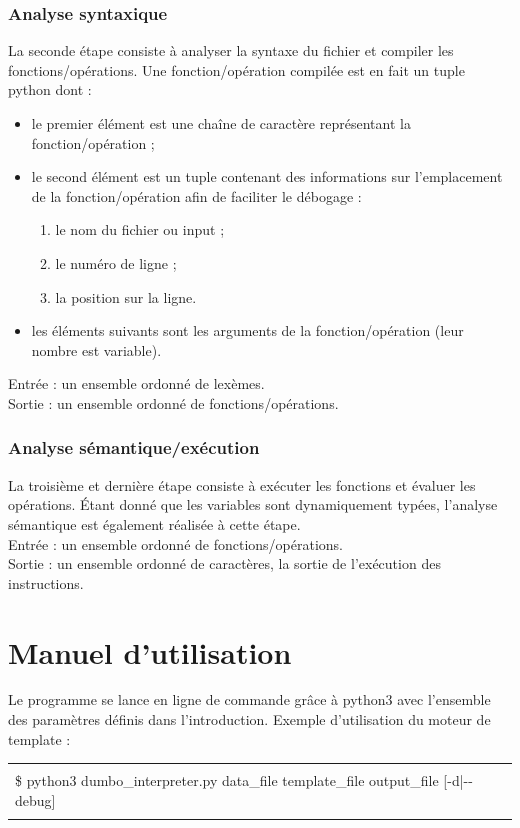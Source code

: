 \documentclass[10pt,a4paper]{article}
\begin{document}
	\subsubsection{Analyse syntaxique}
	La seconde étape consiste à analyser la syntaxe du fichier et compiler les fonctions/opérations.
	Une fonction/opération compilée est en fait un tuple python dont :
	\begin{itemize}
		\item le premier élément est une chaîne de caractère représentant la fonction/opération ;
		\item le second élément est un tuple contenant des informations sur l'emplacement de la fonction/opération afin de faciliter le débogage :
		\begin{enumerate}
			\item le nom du fichier ou input ;
			\item le numéro de ligne ;
			\item la position sur la ligne.
		\end{enumerate}
		\item les éléments suivants sont les arguments de la fonction/opération (leur nombre est variable).
	\end{itemize}
	Entrée : un ensemble ordonné de lexèmes.\\
	Sortie : un ensemble ordonné de fonctions/opérations.
	
	\subsubsection{Analyse sémantique/exécution}
	La troisième et dernière étape consiste à exécuter les fonctions et évaluer les opérations.
	Étant donné que les variables sont dynamiquement typées, l'analyse sémantique est également réalisée à cette étape.\\
	Entrée : un ensemble ordonné de fonctions/opérations.\\
	Sortie : un ensemble ordonné de caractères, la sortie de l'exécution des instructions.
	
	\newpage
	\section{Manuel d'utilisation}
	Le programme se lance en ligne de commande grâce à python3 avec l'ensemble des paramètres définis dans l'introduction. Exemple d'utilisation du moteur de template :
	
	\begin{center}
	\begin{tabular}{|l|}
		\hline \\
		\$ python3 dumbo\_interpreter.py data\_file template\_file output\_file [-d|-{}-debug]\\
		\\
		\hline
	\end{tabular}
	\end{center}
	
\end{document}
